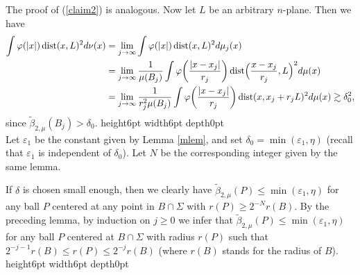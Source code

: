 \documentclass[12pt,leqno]{article}
\newcommand\qed{\hfill\vrule height6pt width6pt depth0pt}
\newcommand{\vphi}{{\varphi}}
\newcommand{\rf}[1]{{(\ref{#1})}}
\newcommand{\wt}[1]{{\widetilde{#1}}}
\newcommand{\ve}{{\varepsilon}}
\newcommand{\dist}{\mathrm{dist}}
\theoremstyle{plain}
\newenvironment{proof}{\medskip\noindent{\bf Proof: }\rmfamily}{\medskip}
\numberwithin{equation}{section}
\begin{document}
\begin{proof}
The proof of \rf{claim2} is analogous. Now let $L$ be
an arbitrary $n$-plane. Then we have
\begin{align}
\int \vphi(|x|)\,\dist(x,L)^2d\nu(x) & = \lim_{j\to\infty} \int
\vphi(|x|)\, \dist(x,L)^2d\mu_j(x) \nonumber\\
& = \lim_{j\to\infty}\frac1{\mu(B_j)} \int
\vphi\biggl(\frac{|x-x_j|}{r_j}\biggr)\,
\dist\Bigl(\frac{x-x_j}{r_j},L\Bigr)^2d\mu(x) \nonumber\\
& = \lim_{j\to\infty} \frac1{r_j^2\mu(B_j)} \int
\vphi\biggl(\frac{|x-x_j|}{r_j}\biggr)\, \dist(x,x_j+r_j L)^2d\mu(x)
\gtrsim \delta_0^2,
\end{align}
since $\wt\beta_{2,\mu}(B_j)>\delta_0$.
\end{proof}\qed\\




Let $\ve_1$ be the constant given by Lemma \ref{mlem}, and set
$\delta_0 = \min(\ve_1,\eta)$ (recall that $\ve_1$ is independent of
$\delta_0$). Let $N$ be the corresponding integer given by the same
lemma.

If $\delta$ is chosen small enough, then we clearly have
$\wt\beta_{2,\mu}(P)\leq\min(\ve_1,\eta)$ for any ball $P$ centered
at any point in $B\cap\Sigma$ with $r(P)\geq 2^{-N}r(B)$. By
the preceding lemma, by induction on $j\geq0$ we infer that
$\wt\beta_{2,\mu}(P)\leq\min(\ve_1,\eta)$ for any ball $P$ centered at
$B\cap\Sigma$ with
radius $r(P)$ such that $2^{-j-1}r(B) \leq r(P) \leq2^{-j}r(B)$
(where $r(B)$ stands for the radius of $B$). \qed\\
\end{document}

